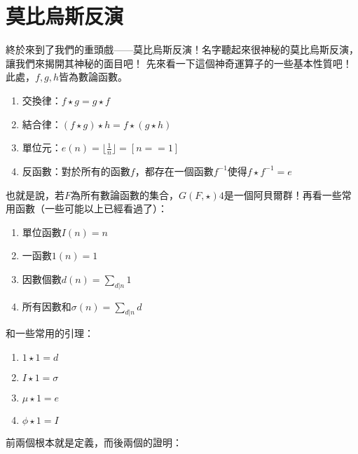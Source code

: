 \documentclass[main.tex]{subfiles}
\begin{document}
\section{莫比烏斯反演}
	終於來到了我們的重頭戲——莫比烏斯反演！名字聽起來很神秘的莫比烏斯反演，讓我們來揭開其神秘的面目吧！
	先來看一下這個神奇運算子的一些基本性質吧！此處，$f, g, h$皆為數論函數。
	\begin{enumerate}
		\item 交換律：$f \star g = g \star f$
		\item 結合律：$(f \star g) \star h = f \star (g \star h)$
		\item 單位元：$e(n) = \lfloor \frac{1}{n} \rfloor = [n == 1]$
		\item 反函數：對於所有的函數$f$，都存在一個函數$f^{-1}$使得$f \star f^{-1} = e$ 
	\end{enumerate}
	也就是說，若$F$為所有數論函數的集合，$G(F, \star)4$是一個阿貝爾群！再看一些常用函數（一些可能以上已經看過了）：
	\begin{enumerate}
		\item 單位函數$I(n) = n$
		\item 一函數$1(n) = 1$
		\item 因數個數$d(n) = \sum_{d | n} 1$
		\item 所有因數和$\sigma(n) = \sum_{d | n} d$
	\end{enumerate}
	和一些常用的引理：
	\begin{enumerate}
		\item $1 \star 1 = d$
		\item $I \star 1 = \sigma$
		\item $\mu \star 1 = e$
		\item $\phi \star 1 = I$
	\end{enumerate}
	前兩個根本就是定義，而後兩個的證明：

	
\end{document}
